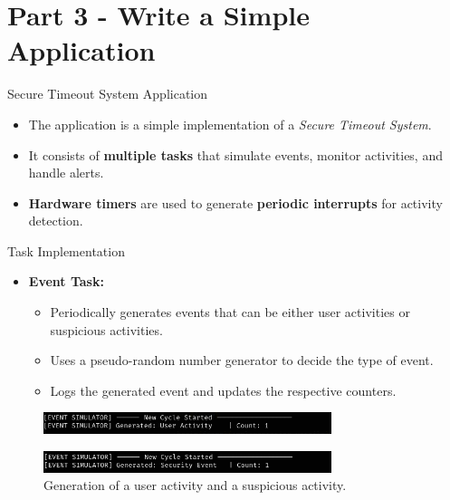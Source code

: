 
\section{Part 3 - Write a Simple Application}

\begin{frame}{Secure Timeout System Application}
    \begin{itemize}
        \item The application is a simple implementation of a \textit{Secure Timeout System}.
        \item It consists of \textbf{multiple tasks} that simulate events, monitor activities, and handle alerts.
        \item \textbf{Hardware timers} are used to generate \textbf{periodic interrupts} for activity detection.
    \end{itemize}
\end{frame}

\begin{frame}{Task Implementation}
    \begin{itemize}
        \item \textbf{Event Task:}
            \begin{itemize}
                \item Periodically generates events that can be either user activities or suspicious activities.
                \item Uses a pseudo-random number generator to decide the type of event.
                \item Logs the generated event and updates the respective counters.
            \end{itemize}
    \end{itemize}
    \begin{figure}[h]
        \centering
        \includegraphics[width=0.75\textwidth]{resources/images/event_task_1.png}
    \end{figure}
    \begin{figure}[h]
        \centering
        \includegraphics[width=0.75\textwidth]{resources/images/event_task_2.png}
        \caption{Generation of a user activity and a suspicious activity.}
    \end{figure}
\end{frame}

